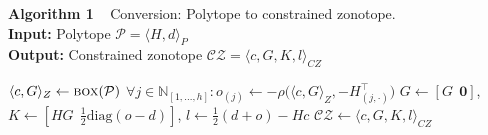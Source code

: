 \algruletop{}
\textbf{Algorithm 1} ~ Conversion: Polytope to constrained zonotope. \\
\textbf{Input:} Polytope $\mathcal{P} = \langle H, d \rangle_P$ \\
\textbf{Output:} Constrained zonotope $\mathcal{CZ} = \langle c, G, K, l \rangle_{CZ}$

\begin{algorithmic}[1]
	\State $\langle c, G \rangle_Z \gets \textsc{box}( \mathcal{P} )$
    \State $\forall j \in \mathbb{N}_{[1,...,h]}\colon o_{(j)} \gets -\rho\big( \langle c, G \rangle_Z,-H_{(j,\cdot)}^\top \big)$
    \State $G \gets [G \;\, \mathbf{0}]$, $K \gets [H G \;\, \tfrac{1}{2}\mathrm{diag}(o - d)]$, $l \gets \tfrac{1}{2}(d+o) - Hc$
    \State $\mathcal{CZ} \gets \langle c, G, K, l \rangle_{CZ}$
\end{algorithmic}
\algrulebottom{}
